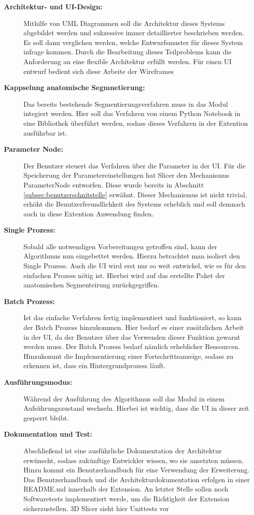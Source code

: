 \begin{description}
	\item[\textbf{Architektur- und UI-Design:}] Mithilfe von UML Diagrammen soll die
		Architektur dieses Systems abgebildet werden und sukzessive immer detaillierter
		beschrieben werden. Es soll dann verglichen werden, welche Entwurfsmuster für
		dieses System infrage kommen. Durch die Bearbeitung dieses Teilproblems kann
		die Anforderung an eine flexible Architektur erfüllt werden. Für einen UI entwurf
		bedient sich diese Arbeite der Wireframes

	\item[\textbf{Kappselung anatomische Segmnetierung:}] Das bereits bestehende Segmentierungsverfahren
		muss in das Modul integiert werden. Hier soll das Verfahren von einem Python
		Notebook in eine Bibliothek überführt werden, sodass dieses Verfahren in der
		Extention ausführbar ist.

	\item[\textbf{Parameter Node:}] Der Benutzer steuert das Verfahren über die Parameter
		in der UI. Für die Speicherung der Parametereinstellungen hat Slicer den
		Mechanismus ParameterNode entworfen. Diese wurde bereits in Abschnitt \ref{subsec:benutzerschnitstelle}
		erwähnt. Dieser Mechanismus ist nicht trivial, erhöht die Benutzerfreundlichkeit
		des Systems erheblich und soll demnach auch in diese Extention Anwendung finden.

	\item[\textbf{Single Prozess:}] Sobald alle notwendigen Vorbereitungen getroffen
		sind, kann der Algorithmus nun eingebettet werden. Hierzu betrachtet man isoliert
		den Single Prozess. Auch die UI wird erst nur so weit entwickel, wie es für den
		einfachen Prozess nötig ist. Hierbei wird auf das erstellte Paket der
		anatomischen Segmenteirung zurückgegriffen.

	\item[\textbf{Batch Prozess:}] Ist das einfache Verfahren fertig implementiert
		und funktioniert, so kann der Batch Prozess hinzukommen. Hier bedarf es einer
		zusätzlichen Arbeit in der UI, da der Benutzer über das Verwenden dieser
		Funktion gewarnt werden muss. Der Batch Prozess bedarf nämlich erheblicher Ressourcen.
		Hinzukommt die Implementierung einer Fortschrittsanzeige, sodass zu erkennen
		ist, dass ein Hintergrundprozess läuft.

	\item[\textbf{Ausführungsmodus:}] Während der Ausführung des Algorithmus soll das
		Modul in einem Aufsührungszustand wechseln. Hierbei ist wichtig, dass die UI
		in dieser zeit gesperrt bleibt.

	\item[\textbf{Dokumentation und Test:}] Abschließend ist eine ausführliche Dokumentation
		der Architektur erwünscht, sodass zukünftige Entwickler wissen, wo sie ansetzten
		müssen. Hinzu kommt ein Benutzerhandbuch für eine Verwendung der Erweiterung.
		Das Benutzerhandbuch und die Architekturdokumentation erfolgen in einer README.md
		innerhalb der Extension. An letzter Stelle sollen noch Softwaretests
		implementiert werde, um die Richtigkeit der Extension sicherzustellen. 3D
		Slicer sieht hier Unittests vor
\end{description}

